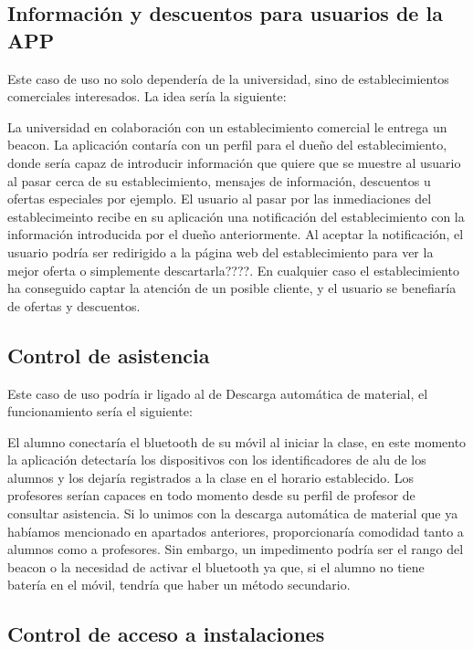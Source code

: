 \subsection{Información y descuentos para usuarios de la APP}

Este caso de uso no solo dependería de la universidad, sino de establecimientos comerciales interesados. La idea sería la siguiente: 

La universidad en colaboración con un establecimiento comercial le entrega un beacon. La aplicación contaría con un perfil para el dueño del establecimiento, donde sería capaz de introducir información que quiere que se muestre al usuario al pasar cerca de su establecimiento, mensajes de información, descuentos u ofertas especiales por ejemplo. El usuario al pasar por las inmediaciones del establecimeinto recibe en su aplicación una notificación del establecimiento con la información introducida por el dueño anteriormente. Al aceptar la notificación, el usuario podría ser redirigido a la página web del establecimiento para ver la mejor oferta \textcolor[rgb]{0,1,0}{o simplemente descartarla????}. En cualquier caso el establecimiento ha conseguido captar la atención de un posible cliente, y el usuario se benefiaría de ofertas y descuentos. 

\subsection{Control de asistencia}

Este caso de uso podría ir ligado al de Descarga automática de material, el funcionamiento sería el siguiente: 

El alumno conectaría el bluetooth de su móvil al iniciar la clase, en este momento la aplicación detectaría los dispositivos con los identificadores de alu de los alumnos y los dejaría registrados a la clase en el horario establecido. Los profesores serían capaces en todo momento desde su perfil de profesor de consultar asistencia. Si lo unimos con la descarga automática de material que ya habíamos mencionado en apartados anteriores, proporcionaría comodidad tanto a alumnos como a profesores. Sin embargo, un impedimento podría ser el rango del beacon o la necesidad de activar el bluetooth ya que, si el alumno no tiene batería en el móvil, tendría que haber un método secundario. 

\subsection{Control de acceso a instalaciones}

